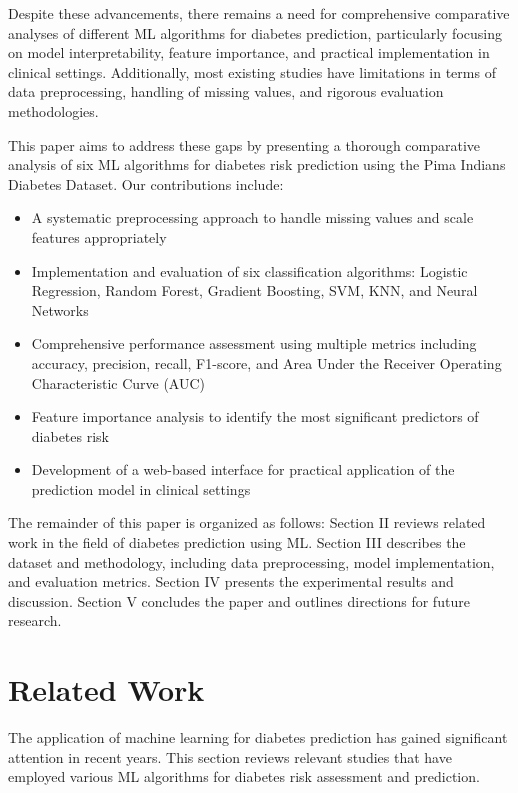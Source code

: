 \documentclass[conference]{IEEEtran}
\begin{document}
Despite these advancements, there remains a need for comprehensive comparative analyses of different ML algorithms for diabetes prediction, particularly focusing on model interpretability, feature importance, and practical implementation in clinical settings. Additionally, most existing studies have limitations in terms of data preprocessing, handling of missing values, and rigorous evaluation methodologies.

This paper aims to address these gaps by presenting a thorough comparative analysis of six ML algorithms for diabetes risk prediction using the Pima Indians Diabetes Dataset. Our contributions include:

\begin{itemize}
    \item A systematic preprocessing approach to handle missing values and scale features appropriately
    \item Implementation and evaluation of six classification algorithms: Logistic Regression, Random Forest, Gradient Boosting, SVM, KNN, and Neural Networks
    \item Comprehensive performance assessment using multiple metrics including accuracy, precision, recall, F1-score, and Area Under the Receiver Operating Characteristic Curve (AUC)
    \item Feature importance analysis to identify the most significant predictors of diabetes risk
    \item Development of a web-based interface for practical application of the prediction model in clinical settings
\end{itemize}

The remainder of this paper is organized as follows: Section II reviews related work in the field of diabetes prediction using ML. Section III describes the dataset and methodology, including data preprocessing, model implementation, and evaluation metrics. Section IV presents the experimental results and discussion. Section V concludes the paper and outlines directions for future research.

\section{Related Work}
The application of machine learning for diabetes prediction has gained significant attention in recent years. This section reviews relevant studies that have employed various ML algorithms for diabetes risk assessment and prediction.
\end{document}

